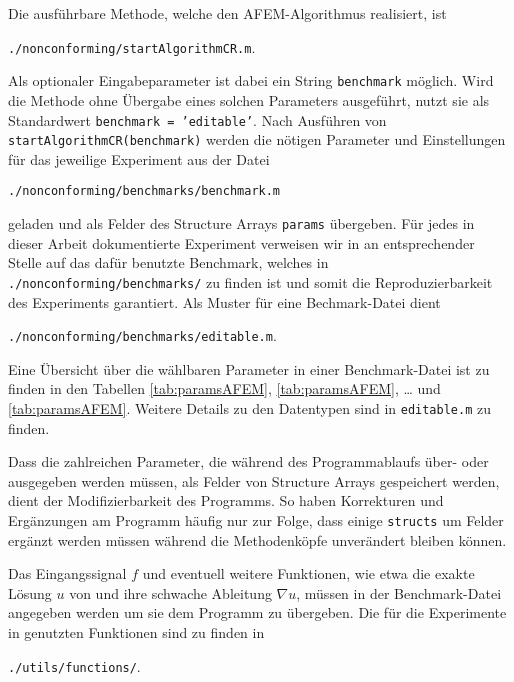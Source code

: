 Die ausführbare Methode, welche den AFEM-Algorithmus realisiert, ist
\begin{center}
  \texttt{./nonconforming/startAlgorithmCR.m}.
\end{center}
Als optionaler Eingabeparameter ist dabei ein String \texttt{benchmark}
möglich. 
Wird die Methode ohne Übergabe eines solchen Parameters ausgeführt, nutzt
sie als Standardwert \texttt{benchmark = 'editable'}.
Nach Ausführen von \texttt{startAlgorithmCR(benchmark)} werden die nötigen
Parameter und Einstellungen für das jeweilige Experiment aus der Datei
\begin{center}
  \texttt{./nonconforming/benchmarks/benchmark.m}
\end{center}
geladen und als Felder des Structure Arrays \texttt{params} übergeben. Für
jedes in dieser Arbeit dokumentierte Experiment verweisen wir in
 an entsprechender Stelle auf das dafür benutzte 
Benchmark, welches in \texttt{./nonconforming/benchmarks/} zu finden ist und
somit die Reproduzierbarkeit des Experiments garantiert. 
Als Muster für eine Bechmark-Datei dient
\begin{center}
  \texttt{./nonconforming/benchmarks/editable.m}.
\end{center}
Eine Übersicht über die wählbaren Parameter in einer Benchmark-Datei ist
zu finden in den Tabellen \ref{tab:paramsAFEM}, \ref{tab:paramsAFEM}, \ldots
und \ref{tab:paramsAFEM}. 
Weitere Details zu den Datentypen sind in \texttt{editable.m} zu finden.

Dass die zahlreichen Parameter, die während des Pro\-gramm\-ab\-laufs
über- oder ausgegeben werden müssen, als Felder von
Struc\-ture Ar\-rays gespeichert werden, dient der Modifizierbarkeit des
Programms. 
So haben Korrekturen und Ergänzungen am Programm häufig nur zur Folge, dass
einige \texttt{structs} um Felder ergänzt werden müssen während die 
Methodenköpfe unverändert bleiben können.

Das Eingangssignal $f$ und eventuell weitere Funktionen, wie etwa die exakte
Lösung $u$ von  und ihre schwache Ableitung
$\nabla u$, müssen in der Benchmark-Datei angegeben werden um sie dem
Programm zu übergeben. 
Die für die Experimente in  genutzten Funktionen sind zu
finden in 
\begin{center}
  \texttt{./utils/functions/}.
\end{center}

